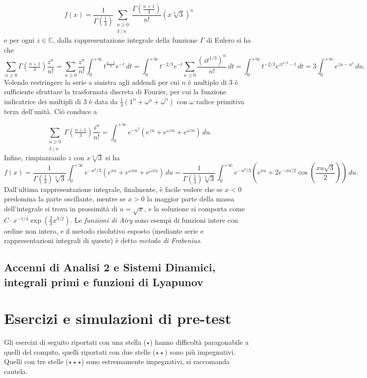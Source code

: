 \documentclass[a4paper,twoside]{article}
\newcommand{\C}{\mathbb{C}}
\theoremstyle{definition}
\numberwithin{theorem}{section}
\begin{document}
$$ f(x) = \frac{1}{\Gamma\left(\frac{1}{3}\right)}\sum_{\substack{n\geq 0 \\ 3\mid n}}\frac{\Gamma\left(\frac{n+1}{3}\right)}{n!}(x\sqrt[3]{3})^n $$
e per ogni $z\in\C$, dalla rappresentazione integrale della funzione $\Gamma$ di Eulero si ha che 
$$\sum_{n\geq 0}\Gamma\left(\tfrac{n+1}{3}
\right)\frac{z^n}{n!}=\sum_{n\geq 0}\frac{z^n}{n!}\int_{0}^{+\infty} t^{\frac{n-2}{3}} e^{-t}\,dt = \int_{0}^{+\infty}t^{-2/3}e^{-t}\sum_{n\geq 0}\frac{(zt^{1/3})^n}{n!}\,dt=\int_{0}^{+\infty}t^{-2/3}e^{zt^{1/3}-t}\,dt = 3\int_{0}^{+\infty}e^{zu-u^3}\,du. $$
Volendo restringere la serie a sinistra agli addendi per cui $n$ è multiplo di $3$ è sufficiente sfruttare la trasformata discreta di Fourier, per cui la funzione indicatrice dei multipli di $3$ è data da $\frac{1}{3}\left(1^n+\omega^n+\overline{\omega}^n\right)$ con $\omega$ radice primitiva terza dell'unità. Ciò conduce a 

$$\sum_{\substack{n\geq 0\\ 3\mid n}}\Gamma\left(\tfrac{n+1}{3}
\right)\frac{z^n}{n!}=\int_{0}^{+\infty}e^{-u^3}\left(e^{zu}+e^{\omega z u}+e^{\overline{\omega}z u}\right)\,du.$$
Infine, rimpiazzando $z$ con $x\sqrt[3]{3}$ si ha 
$$ f(x) = \frac{1}{\Gamma\left(\frac{1}{3}\right)\sqrt[3]{3}}\int_{0}^{+\infty}e^{-u^3/3}\left(e^{xu}+e^{\omega xu}+e^{\overline{\omega} xu}\right)\,du  = \frac{1}{\Gamma\left(\frac{1}{3}\right)\sqrt[3]{3}}\int_{0}^{+\infty}e^{-u^3/3}\left(e^{xu}+2e^{-xu/2}\cos\left(\frac{xu\sqrt{3}}{2}\right)\right)\,du.$$
Dall'ultima rappresentazione integrale, finalmente, è facile vedere che se $x<0$ predomina la parte oscillante, mentre se $x>0$ la maggior parte della massa dell'integrale si trova in prossimità di $u=\sqrt{x}$, e la soluzione si comporta come $C\cdot x^{-1/4}\exp\left(\frac{2}{3}x^{3/2}\right)$. Le \emph{funzioni di Airy} sono esempi di funzioni intere con ordine non intero, e il metodo risolutivo esposto (mediante serie e rappresentazioni integrali di queste) è detto \emph{metodo di Frobenius}.

\subsection{Accenni di Analisi 2 e Sistemi Dinamici, integrali primi e funzioni di Lyapunov}

\newpage

\section{Esercizi e simulazioni di pre-test}
Gli esercizi di seguito riportati con una stella ($\star$) hanno difficoltà paragonabile a quelli del compito, quelli riportati con due stelle ($\star\star$) sono più impegnativi. Quelli con tre stelle ($\star\star\star$) sono estremamente impegnativi, si raccomanda cautela.\\
\end{document}
